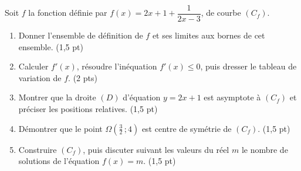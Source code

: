\begin{devoir}[2 heures]
Soit $f$ la fonction définie par $f(x) = 2x+1+\dfrac{1}{2x-3}$, de courbe
$(C_{f})$.
\begin{enumerate}[label=\textbf{\arabic*.}, leftmargin=*, itemsep=0.2em]
  \item Donner l'ensemble de définition de $f$ et ses limites aux bornes de
        cet ensemble. \hfill\textup{(1,5 pt)}
  \item Calculer $f'(x)$, résoudre l'inéquation $f'(x) \leq 0$, puis dresser
        le tableau de variation de $f$. \hfill\textup{(2 pts)}
  \item Montrer que la droite $(D)$ d'équation $y = 2x+1$ est asymptote à
        $(C_{f})$ et préciser les positions relatives. \hfill\textup{(1,5 pt)}
  \item Démontrer que le point $\Omega\left(\frac32\,;4\right)$ est centre de
        symétrie de $(C_{f})$. \hfill\textup{(1,5 pt)}
  \item Construire $(C_{f})$, puis discuter suivant les valeurs du réel $m$
        le nombre de solutions de l'équation $f(x) = m$.
        \hfill\textup{(1,5 pt)}
\end{enumerate}
\end{devoir}

